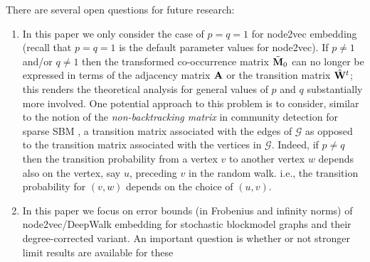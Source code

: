 \documentclass[10pt,journal,compsoc]{IEEEtran}
\newcommand{\M}[1]{{{\mathbf{\MakeUppercase{#1}}}}}
\numberwithin{equation}{section}
\begin{document}
There are several open questions for future research: 
\begin{enumerate}
  \item
  In this paper we only consider the case of $p=q=1$ for node2vec
  embedding (recall that $p = q = 1$ is the default parameter values for
  node2vec). If $p \not = 1$ and/or $q \not = 1$ then the transformed co-occurrence matrix 
  $\tilde{\M M}_0$ can no longer be expressed in
  terms of the adjacency matrix $\M A$ or the transition matrix
  $\hat{\M W}^t$;
  this renders the theoretical analysis for general values of $p$ and
  $q$ substantially more involved. %
  One potential approach to this problem is to consider,
  similar to the notion of the {\em non-backtracking matrix} in
  community detection for sparse SBM \cite{bordenave2015non}, a
  transition matrix associated with the edges of $\mathcal{G}$ as
opposed to the transition matrix associated with the vertices in
  $\mathcal{G}$.  Indeed, if $p \not = q$ then the transition probability from a vertex $v$ to another vertex $w$ depends also on the vertex, say $u$, preceding $v$ in the random walk. i.e.,
  the transition probability for $(v,w)$ depends on the choice of $(u,v)$.
\item In this paper we focus on error bounds (in Frobenius and infinity norms) of node2vec/DeepWalk
  embedding for stochastic blockmodel graphs and their degree-corrected variant. An important question is whether
  or not stronger limit results are available for these

\end{enumerate}
\end{document}
